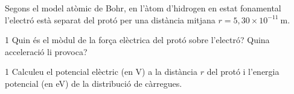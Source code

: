 Segons el model atòmic de Bohr, en l'àtom d'hidrogen en estat fonamental l'electró està separat del protó per una distància mitjana $r = 5,30\times 10^{-11}\ \mathrm{m}$.


\begin{apartat}{1}
Quin és el mòdul de la força elèctrica del protó sobre l'electró? Quina acceleració li provoca?
\end{apartat}

\begin{apartat}{1}
Calculeu el potencial elèctric (en V) a la distància $r$ del protó i l'energia potencial (en eV) de la distribució de càrregues.
\end{apartat}

